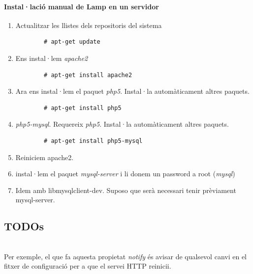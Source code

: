 \documentclass[a4paper]{article}
\begin{document}
\paragraph{Instal·lació manual de Lamp en un servidor \\}
\begin{enumerate}
	\item Actualitzar les llistes dels repositoris del sistema
		\begin{verbatim}
		# apt-get update
		\end{verbatim}
	\item Ens instal·lem \textit{apache2}
		\begin{verbatim}
		# apt-get install apache2
		\end{verbatim}
	\item Ara ens instal·lem el paquet \textit{php5}. Instal·la automàticament altres paquets.
		\begin{verbatim}
		# apt-get install php5
		\end{verbatim}
	\item \textit{php5-mysql}. Requereix \textit{php5}. Instal·la automàticament altres paquets.
		\begin{verbatim}
		# apt-get install php5-mysql
		\end{verbatim}
	\item Reiniciem apache2. 
	\item instal·lem el paquet \textit{mysql-server} i li donem un password a root (\textit{mysql})
	\item Idem amb libmysqlclient-dev. Suposo que serà necessari tenir prèviament mysql-server. %
\end{enumerate}


\subsection{TODOs}
\\
Per exemple, el que fa aquesta propietat \textit{notify} \'es avisar de qualsevol canvi en el fitxer de configuració per a que el servei HTTP reinicii.
\end{document}
